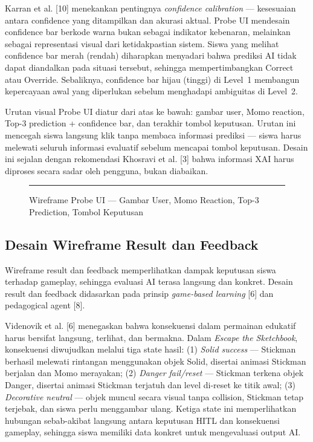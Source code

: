 \documentclass[12pt,oneside]{report}
\begin{document}
Karran et al. [10] menekankan pentingnya \textit{confidence calibration} --- kesesuaian antara confidence yang ditampilkan dan akurasi aktual. Probe UI mendesain confidence bar berkode warna bukan sebagai indikator kebenaran, melainkan sebagai representasi visual dari ketidakpastian sistem. Siswa yang melihat confidence bar merah (rendah) diharapkan menyadari bahwa prediksi AI tidak dapat diandalkan pada situasi tersebut, sehingga mempertimbangkan Correct atau Override. Sebaliknya, confidence bar hijau (tinggi) di Level~1 membangun kepercayaan awal yang diperlukan sebelum menghadapi ambiguitas di Level~2.

Urutan visual Probe UI diatur dari atas ke bawah: gambar user, Momo reaction, Top-3 prediction + confidence bar, dan terakhir tombol keputusan. Urutan ini mencegah siswa langsung klik tanpa membaca informasi prediksi --- siswa harus melewati seluruh informasi evaluatif sebelum mencapai tombol keputusan. Desain ini sejalan dengan rekomendasi Khosravi et al. [3] bahwa informasi XAI harus diproses secara sadar oleh pengguna, bukan diabaikan.

\begin{figure}[H]
    \centering
    \rule{0.9\textwidth}{6cm}
    \caption{Wireframe Probe UI --- Gambar User, Momo Reaction, Top-3 Prediction, Tombol Keputusan}
    \label{fig:wireframe-probe-ui}
\end{figure}


\subsection{Desain Wireframe Result dan Feedback}
\label{subsec:wireframe-result-feedback}

Wireframe result dan feedback memperlihatkan dampak keputusan siswa terhadap gameplay, sehingga evaluasi AI terasa langsung dan konkret. Desain result dan feedback didasarkan pada prinsip \textit{game-based learning} [6] dan pedagogical agent [8].

Videnovik et al. [6] menegaskan bahwa konsekuensi dalam permainan edukatif harus bersifat langsung, terlihat, dan bermakna. Dalam \textit{Escape the Sketchbook}, konsekuensi diwujudkan melalui tiga state hasil: (1) \textit{Solid success} --- Stickman berhasil melewati rintangan menggunakan objek Solid, disertai animasi Stickman berjalan dan Momo merayakan; (2) \textit{Danger fail/reset} --- Stickman terkena objek Danger, disertai animasi Stickman terjatuh dan level di-reset ke titik awal; (3) \textit{Decorative neutral} --- objek muncul secara visual tanpa collision, Stickman tetap terjebak, dan siswa perlu menggambar ulang. Ketiga state ini memperlihatkan hubungan sebab-akibat langsung antara keputusan HITL dan konsekuensi gameplay, sehingga siswa memiliki data konkret untuk mengevaluasi output AI.
\end{document}

